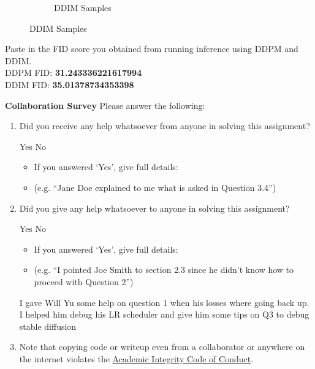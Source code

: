 \documentclass[11pt,addpoints,answers]{exam}
\numberwithin{equation}{section} %
\numberwithin{figure}{section} %
\numberwithin{table}{section} %
\begin{document}
\begin{questions}
\begin{figure}[H]
\begin{subfigure}[b]{0.32\linewidth}
        \caption{DDIM Samples}
    \end{subfigure}
\end{figure}
\question Paste in the FID score you obtained from running inference using DDPM and DDIM.
\\
DDPM FID: \textbf{31.243336221617994} \\
DDIM FID: \textbf{35.01378734353398} 

\end{questions}
\clearpage

\clearpage

\textbf{Collaboration Survey} Please answer the following:

\begin{enumerate}
    \item Did you receive any help whatsoever from anyone in solving this assignment?
    \begin{checkboxes}
     \choice Yes
     \CorrectChoice No
    \end{checkboxes}
    \begin{itemize}
        \item If you answered `Yes', give full details:
        \item (e.g. “Jane Doe explained to me what is asked in Question 3.4”)
    \end{itemize}

    \begin{tcolorbox}[fit,height=3cm,blank, borderline={1pt}{-2pt},nobeforeafter]
    \end{tcolorbox}

    \item Did you give any help whatsoever to anyone in solving this assignment?
    \begin{checkboxes}
     \CorrectChoice Yes
     \choice No\
    \end{checkboxes}
    \begin{itemize}
        \item If you answered `Yes', give full details:
        \item (e.g. “I pointed Joe Smith to section 2.3 since he didn’t know how to proceed with Question 2”)
    \end{itemize}

    \begin{tcolorbox}[fit,height=3cm,blank, borderline={1pt}{-2pt},nobeforeafter]
    I gave Will Yu some help on question 1 when his losses where going back up. I helped him debug his LR scheduler and give him some tips on Q3 to debug stable diffusion
    \end{tcolorbox}

    \item Note that copying code or writeup even from a collaborator or anywhere on the internet violates the \href{hhttps://www.cmu.edu/policies/student-and-student-life/academic-integrity.html}{Academic Integrity Code of Conduct}.
\end{enumerate}
\end{document}
